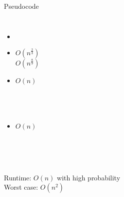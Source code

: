 \documentclass[18pt]{beamer}
\begin{document}
\begin{frame}{Pseudocode}
\begin{columns}
		\begin{itemize}\itemsep0pt
			\item[] \textcolor{white}{$|$}\\
			\vspace{8pt}
			\item[]$O(n^{\frac{2}{3}})$\\ $O(n^{\frac{8}{9}})$ \\ 					
			\item[]$O(n)$\\\textcolor{white}{$|$} \\\textcolor{white}{$|$} \\ \textcolor{white}{$|$}\\  \textcolor{white}{$|$}\\
			\item[]$O(n)$\\\textcolor{white}{$|$} \\ \textcolor{white}{$|$} \\\textcolor{white}{$|$}\\
		\end{itemize}
\end{columns}
\vspace{2ex}
Runtime: \alert{$O(n)$} with high probability\\
Worst case: $O(n^2)$
\end{frame}
\end{document}
